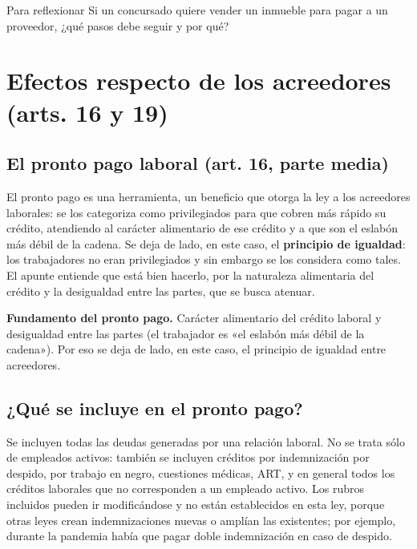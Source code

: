 \documentclass[12pt,oneside]{book}
\begin{document}
\begin{exercise}{Para reflexionar}
Si un concursado quiere vender un inmueble para pagar a un proveedor, ¿qué pasos debe seguir y por qué?
\end{exercise}

\section{Efectos respecto de los acreedores (arts. 16 y 19)}

\subsection{El pronto pago laboral (art. 16, parte media)}

El pronto pago es una herramienta, un beneficio que otorga la ley a los acreedores laborales: se los categoriza como privilegiados para que cobren más rápido su crédito, atendiendo al carácter alimentario de ese crédito y a que son el eslabón más débil de la cadena. Se deja de lado, en este caso, el \textbf{principio de igualdad}: los trabajadores no eran privilegiados y sin embargo se los considera como tales. El apunte entiende que está bien hacerlo, por la naturaleza alimentaria del crédito y la desigualdad entre las partes, que se busca atenuar.

\begin{important}
\textbf{Fundamento del pronto pago.} Carácter alimentario del crédito laboral y desigualdad entre las partes (el trabajador es «el eslabón más débil de la cadena»). Por eso se deja de lado, en este caso, el principio de igualdad entre acreedores.
\end{important}

\subsection{¿Qué se incluye en el pronto pago?}

Se incluyen todas las deudas generadas por una relación laboral. No se trata sólo de empleados activos: también se incluyen créditos por indemnización por despido, por trabajo en negro, cuestiones médicas, ART, y en general todos los créditos laborales que no corresponden a un empleado activo. Los rubros incluidos pueden ir modificándose y no están establecidos en esta ley, porque otras leyes crean indemnizaciones nuevas o amplían las existentes; por ejemplo, durante la pandemia había que pagar doble indemnización en caso de despido.
\end{document}
